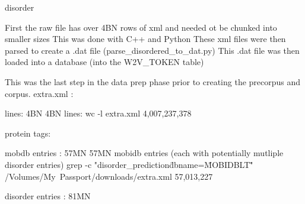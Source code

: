 \documentclass{article}
\begin{document}
disorder

First the raw file has over 4BN rows of xml and needed ot be chunked into smaller sizes
This was done with C++ and Python
These xml files were then parsed to create a .dat file (parse_disordered_to_dat.py)
This .dat file was then loaded into a database (into the W2V_TOKEN table)

This was the last step in the data prep phase prior to creating the precorpus and corpus.
extra.xml : 

lines: 4BN
4BN lines: wc -l extra.xml
4,007,237,378

protein tags: 

mobdb entries : 57MN
57MN mobidb entries (each with potentially mutliple disorder entries)
grep -c "disorder_prediction\" dbname=\"MOBIDBLT\"" /Volumes/My\ Passport/downloads/extra.xml
57,013,227

disorder entries : 81MN
\end{document}
